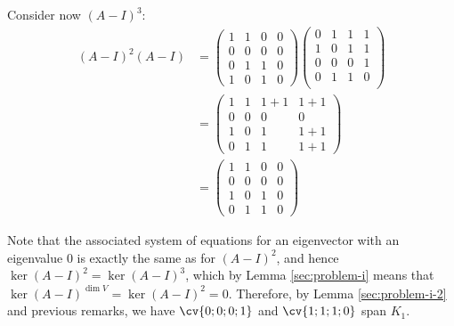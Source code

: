 \documentclass[11pt]{scrartcl}
\begin{document}
\begin{soln}
  Consider now $(A-I)^3$:
  \begin{align}
    (A-I)^2(A-I)                & = \begin{pmatrix}
      1                         & 1 & 0   & 0   \\
      0                         & 0 & 0   & 0   \\
      0                         & 1 & 1   & 0   \\
      1                         & 0 & 1   & 0
    \end{pmatrix}
                      \begin{pmatrix}
                        0       & 1 & 1   & 1   \\
                        1       & 0 & 1   & 1   \\
                        0       & 0 & 0   & 1   \\
                        0       & 1 & 1   & 0   \\
                      \end{pmatrix}             \\
                                & =
                            \begin{pmatrix}
                              1 & 1 & 1+1 & 1+1 \\
                              0 & 0 & 0   & 0   \\
                              1 & 0 & 1   & 1+1 \\
                              0 & 1 & 1   & 1+1
                            \end{pmatrix}       \\
                                & =
                                  \begin{pmatrix}
                                    1 & 1 & 0 & 0\\
                                    0 & 0 & 0 & 0\\
                                    1 & 0 & 1 & 0\\
                                    0 & 1 & 1 & 0
                                  \end{pmatrix}
  \end{align}

  Note that the associated system of equations for an eigenvector with
  an eigenvalue 0 is exactly the same as for $(A-I)^2$, and hence
  $\ker (A-I)^2= \ker(A-I)^3$, which by Lemma \ref{sec:problem-i}
  means that $\ker(A-I)^{\dim V} =\ker (A-I)^2= 0$. Therefore, by
  Lemma \ref{sec:problem-i-2} and previous remarks, we have
  $\cv{0;0;0;1}$ and $\cv{1;1;1;0}$ span $K_1$.




\end{soln}
\end{document}
